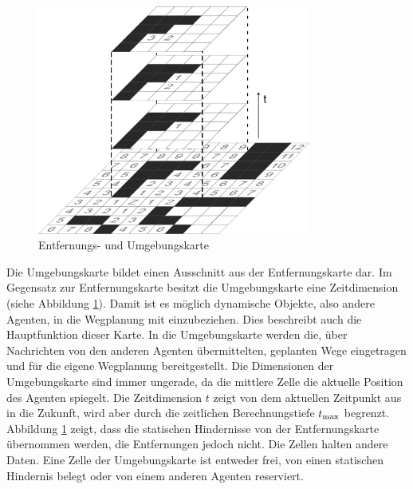 \begin{figure}[H]
    \includegraphics[width=9cm]{images/distance_localmap.png}
    \centering
    \caption{Entfernungs- und Umgebungskarte}
    \label{fig:distance_localmap}
\end{figure}
Die Umgebungskarte bildet einen Ausschnitt aus der Entfernungskarte dar. Im Gegensatz zur Entfernungskarte besitzt die Umgebungskarte eine Zeitdimension (siehe Abbildung \ref{fig:distance_localmap}). Damit ist es möglich dynamische Objekte, also andere Agenten, in die Wegplanung mit einzubeziehen. Dies beschreibt auch die Hauptfunktion dieser Karte. In die Umgebungskarte werden die, über Nachrichten von den anderen Agenten übermittelten, geplanten Wege eingetragen und für die eigene Wegplanung bereitgestellt. Die Dimensionen der Umgebungskarte sind immer ungerade, da die mittlere Zelle die aktuelle Position des Agenten spiegelt. Die Zeitdimension \(t\) zeigt von dem aktuellen Zeitpunkt aus in die Zukunft, wird aber durch die zeitlichen Berechnungstiefe \(t\textsubscript{max}\) begrenzt. Abbildung \ref{fig:distance_localmap} zeigt, dass die statischen Hindernisse von der Entfernungskarte übernommen werden, die Entfernungen jedoch nicht. Die Zellen halten andere Daten. Eine Zelle der Umgebungskarte ist entweder frei, von einen statischen Hindernis belegt oder von einem anderen Agenten reserviert. \cite{book:regele}